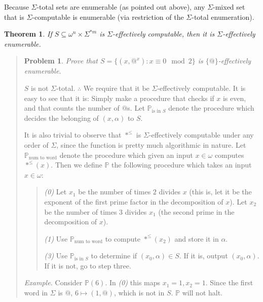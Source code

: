 \documentclass[a4paper, 12pt]{article}
\newtheorem{problem}{Problem}
\newtheorem{theorem}{Theorem}
\newtheorem{problem}{Problem}
\newtheorem{theorem}{Theorem}
\begin{document}
Because $\Sigma$-total sets are enumerable (as pointed out above), any
$\Sigma$-mixed set that is $\Sigma$-computable is enumerable (via restriction
of the $\Sigma$-total enumeration).

\begin{theorem}
    If $S \subseteq \omega^{n} \times \Sigma^{*m} $ is $\Sigma$-effectively
    computable, then it is $\Sigma$-effectively enumerable.
\end{theorem}

\small
\begin{quote}

\begin{problem}
    Prove that $S = \{(x, @^x) : x \equiv 0 \mod 2\}$ is $\{@\}$-effectively
    enumerable.
\end{problem}

$S$ is not $\Sigma$-total. $\therefore $ We require that it be
$\Sigma$-effectively computable. It is easy to see that
it is: Simply make a procedure that checks if $x$ is even, and that counts the
number of $@$s. Let $\mathbb{P}_\text{is in $S$}$ denote the procedure which decides the belonging of
$(x, \alpha)$ to $S$. 

It is also trivial to observe that $*^{\leq}$ is $\Sigma$-effectively
computable under any order of $\Sigma$, since the function is pretty much
algorithmic in nature. Let $\mathbb{P}_{\text{num to word}}$ denote the
procedure which given an input $x \in  \omega$ computes $*^{\leq}(x)$. Then we
define $\mathbb{P}$ the following procedure which takes an input $x \in
\omega$:

\footnotesize 
\begin{quote}
    \textit{(0)} Let $x_1$ be the number of times $2$ divides $x$ (this is, let
    it be the exponent of the first prime factor in the decomposition of $x$).
    Let $x_2$ be the number of times $3$ divides $x_1$ (the second prime in the
    decomposition of $x$).

    \textit{(1)} Use $\mathbb{P}_{\text{num to word}}$ to compute $*^{\leq}(x_2)$
    and store it in $\alpha$. 

    \textit{(3)} Use $\mathbb{P}_{\text{is in $S$}}$ to determine if $(x_0,
    \alpha) \in  S$. If it is, output $(x_0, \alpha)$. If it is not, go to step
    three.
\end{quote}
\small

\textit{Example.} Consider $\mathbb{P}(6)$. In \textit{(0)} this maps $x_1 = 1,
x_2 = 1$. Since the first word in $\Sigma$ is $@$, $6 \mapsto (1, @)$, which is
not in $S$. $\mathbb{P}$ will not halt.


\end{quote}
\end{document}
